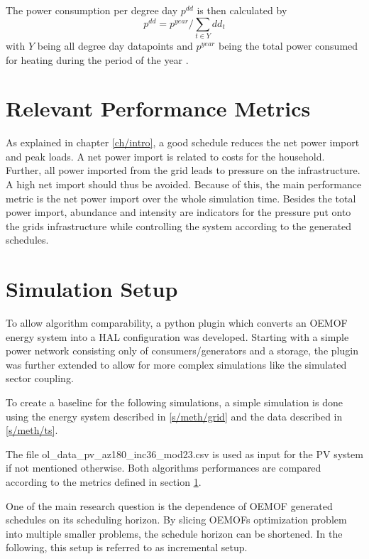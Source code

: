 \documentclass[a4paper,12pt]{book}
\theoremstyle{break}
\begin{document}
The power consumption per degree day $p^{dd}$ is then calculated by 
\begin{equation}
	p^{dd} = p^{year} / \sum_{t\in Y} dd_t
\end{equation}
with $Y$ being all degree day datapoints and $p^{year}$ being the total power consumed for heating during the period of the year .

\section{Relevant Performance Metrics}\label{s/meth/pfm}
As explained in chapter \ref{ch/intro}, a good schedule reduces the net power import and peak loads. 
A net power import is related to costs for the household. Further, all power imported from the grid leads to pressure on the infrastructure. A high net import should thus be avoided.
Because of this, the main performance metric is the net power import over the whole simulation time. Besides the total power import, abundance and intensity are indicators for the pressure put onto the grids infrastructure while controlling the system according to the generated schedules.

\section{Simulation Setup}\label{s/meth/setup}
To allow algorithm comparability, a python plugin which converts an \ac{OEMOF} energy system into a HAL configuration was developed.
Starting with a simple power network consisting only of consumers/generators and a storage, the plugin was further extended to allow for more complex simulations like the simulated sector coupling.

To create a baseline for the following simulations, a simple simulation is done using the energy system described in \ref{s/meth/grid} and the data described in \ref{s/meth/ts}. 

The file ol\_data\_pv\_az180\_inc36\_mod23.csv is used as input for the \ac{PV} system if not mentioned otherwise.
Both algorithms performances are compared according to the metrics defined in section \ref{s/meth/pfm}.

One of the main research question is the dependence of \ac{OEMOF} generated schedules on its scheduling horizon.
By slicing \ac{OEMOF}s optimization problem into multiple smaller problems, the schedule horizon can be shortened.
In the following, this setup is referred to as incremental setup.
\end{document}
